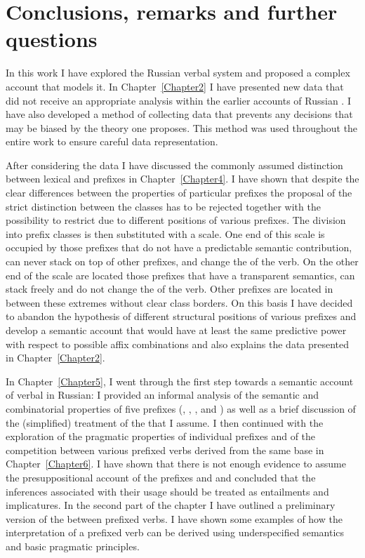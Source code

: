 
\chapter{Conclusions, remarks and further questions} %
\label{Chapter9}\largerpage[2]

In this work I have explored the Russian verbal  system and proposed a complex account that models it. In Chapter~\ref{Chapter2} I have presented new data that did not receive an appropriate analysis within the earlier accounts of Russian . I have also developed a method of collecting data that prevents any decisions that may be biased by the theory one proposes. This method was used throughout the entire work to ensure careful data representation.

After considering the data I have discussed the commonly assumed distinction between lexical and  prefixes in Chapter~\ref{Chapter4}. I have shown that despite the clear differences between the properties of particular prefixes the proposal of the strict distinction between the classes has to be rejected together with the possibility to restrict  due to different positions of various prefixes. The division into prefix classes is then substituted with a scale. One end of this scale is occupied by those prefixes that do not have a predictable semantic contribution, can never stack on top of other prefixes, and change the  of the verb. On the other end of the scale are located those prefixes that have a transparent semantics, can stack freely and do not change the  of the verb. Other prefixes are located in between these extremes without clear class borders. On this basis I have decided to abandon the hypothesis of different structural positions of various prefixes and develop a semantic account that would have at least the same predictive power with respect to possible affix combinations and also explains the data presented in Chapter~\ref{Chapter2}.

In Chapter~\ref{Chapter5}, I went through the first step towards a semantic account of verbal  in Russian: I provided an informal analysis of the semantic and combinatorial properties of five prefixes (, , ,  and ) as well as a brief discussion of the (simplified) treatment of the  that I assume. I then continued with the exploration of the pragmatic properties of individual prefixes and of the competition between various prefixed verbs derived from the same base in Chapter~\ref{Chapter6}. I have shown that there is not enough evidence to assume the presuppositional account of the prefixes  and  and concluded that the inferences associated with their usage should be treated as entailments and implicatures. In the second part of the chapter I have outlined a preliminary version of the  between prefixed verbs. I have shown some examples of how the interpretation of a prefixed verb can be derived using underspecified semantics and basic pragmatic principles. 

